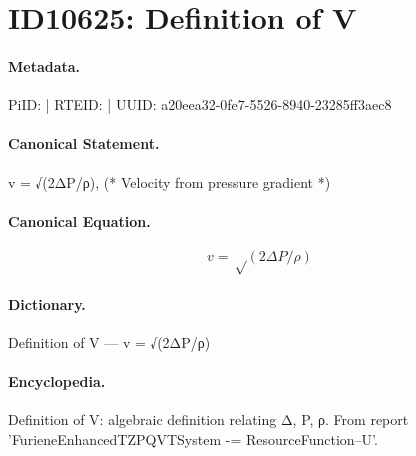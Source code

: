 \section*{ID10625: Definition of V}
\paragraph{Metadata.}
PiID:  | RTEID:  | UUID: a20eea32-0fe7-5526-8940-23285ff3aec8

\paragraph{Canonical Statement.}
v = √(2ΔP/ρ), (* Velocity from pressure gradient *)

\paragraph{Canonical Equation.}
\[
v = √(2ΔP/ρ)
\]

\paragraph{Dictionary.}
Definition of V — v = √(2ΔP/ρ)

\paragraph{Encyclopedia.}
Definition of V: algebraic definition relating Δ, P, ρ. From report 'FurieneEnhancedTZPQVTSystem -= ResourceFunction--U'.
